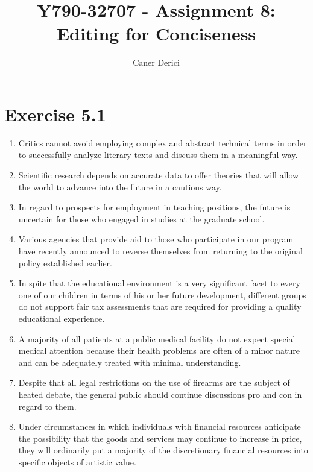\documentclass{article}
\date{Caner Derici}
\title{Y790-32707 - Assignment 8: Editing for Conciseness}
\author{}
\begin{document}

\maketitle%

\section*{Exercise 5.1}

\begin{enumerate}

\item Critics cannot avoid employing complex and abstract technical terms in order to successfully analyze literary texts and discuss them in a meaningful way.

\item Scientific research depends on accurate data to offer theories that will allow the world to advance into the future in a cautious way. 

\item In regard to prospects for employment in teaching positions, the future is uncertain for those who engaged in studies at the graduate school.

\item Various agencies that provide aid to those who participate in our program have recently announced to reverse themselves from returning to the original policy established earlier.

\item In spite that the educational environment is a very significant facet to every one of our children in terms of his or her future development, different groups do not support fair tax assessments that are required for providing a quality educational experience. 

\item A majority of all patients at a public medical facility do not expect special medical attention because their health problems are often of a minor nature and can be adequately treated with minimal understanding. 

\item Despite that all legal restrictions on the use of firearms are the subject of heated debate, the general public should continue discussions pro and con in regard to them.

\item Under circumstances in which individuals with financial resources anticipate the possibility that the goods and services may continue to increase in price, they will ordinarily put a majority of the discretionary financial resources into specific objects of artistic value.


\end{enumerate}
\end{document}
